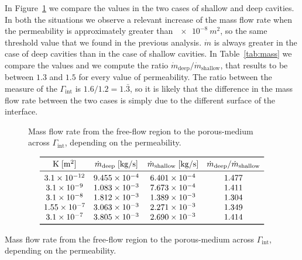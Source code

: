 In Figure~\ref{fig:mass} we compare the values in the two cases of shallow and deep cavities. In both the situations we observe a relevant increase of the mass flow rate when the permeability is approximately greater than $\SI{e-8}{m^2}$, so the same threshold value that we found in the previous analysis. $\dot{m}$ is always greater in the case of deep cavities than in the case of shallow cavities. In Table~\ref{tab:mass} we compare the values and we compute the ratio $\dot{m}_\text{deep} / \dot{m}_\text{shallow}$, that results to be between $1.3$ and $1.5$ for every value of permeability. The ratio between the measure of the $\Gamma_\text{int}$ is $1.6 / 1.2 = 1.\bar{3}$, so it is likely that the difference in the mass flow rate between the two cases is simply due to the different surface of the interface.
\begin{figure}
	\centering
	
	\caption[Mass flow rate across $\Gamma_\text{int}$ depending on the permeability]{Mass flow rate from the free-flow region to the porous-medium across $\Gamma_\text{int}$, depending on the permeability.}
	\label{fig:mass}	
\end{figure}
\begin{table}
	\centering
	\[
	\begin{array}{cccc}
	\toprule
	\mathrm{K} \; [\si{m^2}] & \dot{m}_\text{deep} \; [\si{kg/s}] & \dot{m}_\text{shallow} \; [\si{kg/s}] & \dot{m}_\text{deep} / \dot{m}_\text{shallow}\\
	\midrule
	\num{3.1e-12} & \num{9.455e-4} & \num{6.401e-4} & 1.477\\
	\num{3.1e-9} & \num{1.083e-3} & \num{7.673e-4} & 1.411\\
	\num{3.1e-8} & \num{1.812e-3} & \num{1.389e-3} & 1.304\\
	\num{1.55e-7} & \num{3.063e-3} & \num{2.271e-3} & 1.349\\
	\num{3.1e-7} & \num{3.805e-3} & \num{2.690e-3} & 1.414\\
	\bottomrule
	\end{array}
	\]
	\caption[Mass flow rate across $\Gamma_\text{int}$ depending on the permeability]{Mass flow rate from the free-flow region to the porous-medium across $\Gamma_\text{int}$, depending on the permeability.}
	\label{tab:mass}
\end{table}
